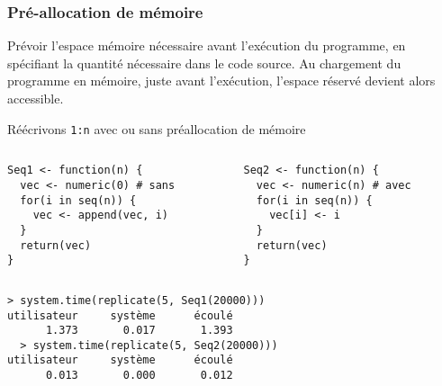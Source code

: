 \documentclass[10pt]{beamer}
\begin{document}
\begin{frame}[fragile]
  \frametitle{Pré-allocation de mémoire}
    Prévoir l’espace mémoire nécessaire avant l’exécution du programme, en spécifiant la quantité nécessaire dans le code source.
  Au chargement du programme en mémoire, juste avant l’exécution, l’espace réservé devient alors accessible.


  \begin{exampleblock}{Réécrivons \texttt{1:n} avec ou sans préallocation de mémoire}
\begin{columns}[t]
\begin{column}{0.48\textwidth}
  \begin{lstlisting}[style=editor]
Seq1 <- function(n) {
  vec <- numeric(0) # sans
  for(i in seq(n)) {
    vec <- append(vec, i)
  }
  return(vec)
}
\end{lstlisting}
\end{column}
\begin{column}{0.48\textwidth}
  \begin{lstlisting}[style=editor]
Seq2 <- function(n) {
  vec <- numeric(n) # avec
  for(i in seq(n)) {
    vec[i] <- i
  }
  return(vec)
}
\end{lstlisting}
\end{column}
\end{columns}
\smallskip
\begin{lstlisting}
> system.time(replicate(5, Seq1(20000)))
utilisateur     système      écoulé
      1.373       0.017       1.393
  > system.time(replicate(5, Seq2(20000)))
utilisateur     système      écoulé
      0.013       0.000       0.012
\end{lstlisting}
\end{exampleblock}

\end{frame}
\end{document}
